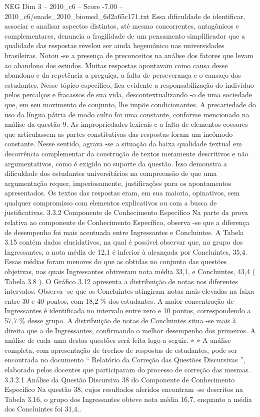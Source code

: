 \begin{textsample}{NEG Dim 3 – 2010\_c6 – Score -7.00 – 2010\_c6/enade\_2010\_biomed\_6d2a65c171.txt}
Essa dificuldade de identificar, associar e analisar aspectos distintos, até mesmo concorrentes, antagônicos e complementares, denuncia a fragilidade de um pensamento simplificador que a qualidade das respostas revelou ser ainda hegemônico nas universidades brasileiras.
Notou -se a presença de preconceitos na análise dos fatores que levam ao abandono dos estudos.
Muitas respostas apontavam como causa desse abandono e da repetência a preguiça, a falta de perseverança e o cansaço dos estudantes.
Nesse tópico específico, fica evidente a responsabilização do indivíduo pelos percalços e fracassos de sua vida, descontextualizando -o de uma sociedade que, em seu movimento de conjunto, lhe impõe condicionantes.
A precariedade do uso da língua pátria de modo culto foi uma constante, conforme mencionado na análise da questão 9.
As impropriedades lexicais e a falta de elementos coesores que articulassem as partes constitutivas das respostas foram um incômodo constante.
Nesse sentido, agrava -se a situação da baixa qualidade textual em decorrência complementar da construção de textos meramente descritivos e não argumentativos, como é exigido no suporte da questão.
Isso demonstra a dificuldade dos estudantes universitários na compreensão de que uma argumentação requer, imperiosamente, justificações para os apontamentos apresentados.
Os textos das respostas eram, em sua maioria, opinativos, sem qualquer compromisso com elementos explicativos ou com a busca de justificativas. 3.3.2 Componente de Conhecimento Específico Na parte da prova relativa ao componente de Conhecimento Específico, observa -se que a diferença de desempenho foi mais acentuada entre Ingressantes e Concluintes.
A Tabela 3.15 contém dados elucidativos, na qual é possível observar que, no grupo dos Ingressantes, a nota média de 12,1 é inferior à alcançada por Concluintes, 35,4.
Essas médias foram menores do que as obtidas no conjunto das questões objetivas, nas quais Ingressantes obtiveram nota média 33,1, e Concluintes, 43,4 ( Tabela 3.8 ).
O Gráfico 3.12 apresenta a distribuição de notas nos diferentes intervalos.
Observa -se que os Concluintes atingiram notas mais elevadas na faixa entre 30 e 40 pontos, com 18,2 \% dos estudantes.
A maior concentração de Ingressantes é identificada no intervalo entre zero e 10 pontos, correspondendo a 57,7 \% desse grupo.
A distribuição de notas de Concluintes situa -se mais à direita que a de Ingressantes, confirmando o melhor desempenho dos primeiros.
A análise de cada uma destas questões será feita logo a seguir. ∗ ∗ A análise completa, com apresentação de trechos de respostas de estudantes, pode ser encontrada no documento “ Relatório da Correção das Questões Discursivas ”, elaborado pelos docentes que participaram do processo de correção das mesmas. 3.3.2.1 Análise da Questão Discursiva 38 do Componente de Conhecimento Específico Na questão 38, cujos resultados aferidos encontram -se descritos na Tabela 3.16, o grupo dos Ingressantes obteve nota média 16,7, enquanto a média dos Concluintes foi 31,4..

\end{textsample}
